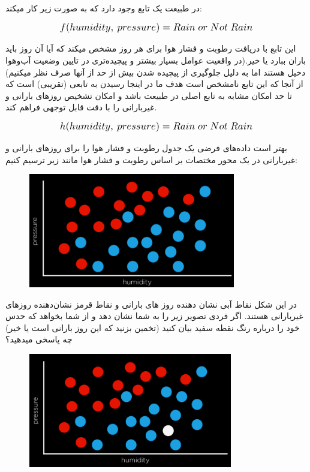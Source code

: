 \documentclass[a4paper, titlepage]{article}
\begin{document}
در طبیعت یک تابع وجود دارد که به صورت زیر کار میکند:

\begin{equation}
    \scalebox{1.2}{${f(humidity,\:pressure) = Rain \; or \; Not \; Rain}$}
    \label{f-function}
\end{equation}

این تابع با دریافت رطوبت و فشار هوا برای هر روز مشخص میکند که آیا آن روز باید باران ببارد یا خیر.(در واقعیت عوامل بسیار بیشتر و پیچیده‌تری در تایین وضعیت آب‌وهوا دخیل هستند اما به دلیل جلوگیری از پیچیده شدن بیش از حد از آنها صرف نظر میکنیم) از آنجا که این تابع نامشخص است هدف ما در اینجا رسیدن به تابعی  (تقریبی) است که تا حد امکان مشابه به تابع اصلی در طبیعت باشد و امکان تشخیص روز‌های بارانی و غیربارانی را با دقت قابل توجهی فراهم کند.

\begin{equation}
    \scalebox{1.2}{${h(humidity,\:pressure) = Rain \; or \; Not \; Rain}$}
    \label{h-function}
\end{equation}

بهتر است داده‌های فرضی یک جدول رطوبت و فشار هوا را برای روز‌های بارانی و غیربارانی در یک محور مختصات بر اساس رطوبت و فشار هوا مانند زیر ترسیم کنیم:

\begin{figure}[H]
    \center
    \includegraphics[height=5cm]{Classification-img10.png}
    \label{Classification-img10}
    \caption{}
\end{figure}

در این شکل نقاط آبی نشان دهنده روز های بارانی و نقاط قرمز نشان‌دهنده روز‌های غیربارانی هستند. اگر فردی تصویر زیر را به شما نشان دهد و از شما بخواهد که حدس خود را درباره رنگ نقطه سفید بیان کنید (تخمین بزنید که این روز بارانی است یا خیر) چه پاسخی میدهید؟

\begin{figure}[H]
    \center
    \includegraphics[height=5cm]{Classification-img11.png}
    \label{Classification-img11}
    \caption{}
\end{figure}
\end{document}
